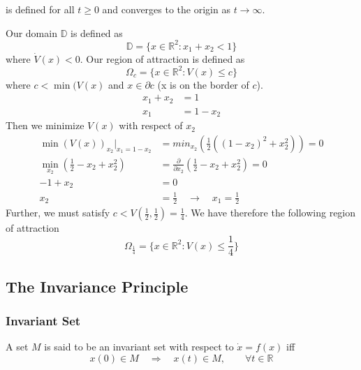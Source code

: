 \documentclass{article}
\newcommand{\mathbbD}{\mathbb{D}}
\newcommand{\mathbbR}{\mathbb{R}}
\begin{document}
is defined for all $t \geq 0$ and converges to the origin as $t \to \infty$.
\begin{frm-ex}
\item
Our domain $\mathbbD$ is defined as
\begin{equation*}
	\mathbbD = \{ x \in \mathbbR^2 : x_1 + x_2 < 1\}
\end{equation*}
where $\dot V(x) < 0$. Our region of attraction is defined as
\begin{equation*}
	\Omega_c = \{ x \in \mathbbR^2 : V(x) \leq c \}
\end{equation*}
where $c < \min(V(x)$ and $x \in \partial c$ (x is on the border of $c$).
\begin{equation*}
	\begin{split}
		x_1 + x_2 & = 1       \\
		x_1       & = 1 - x_2
	\end{split}
\end{equation*}
Then we minimize $V(x)$ with respect of $x_2$
\begin{equation*}
	\begin{split}
		\min(V(x))_{x_2}\bigg|_{x_1=1-x_2} & = min_{x_2}(\frac{1}{2}((1-x_2)^2+x_2^2)) = 0               \\
		\min_{x_2}(\frac{1}{2}-x_2+x_2^2)  & = \frac{\partial}{\partial x_2} (\frac{1}{2}-x_2+x_2^2) = 0 \\
		-1 + x_2                           & = 0                                                         \\
		x_2                                & = \frac{1}{2} \quad \to \quad x_1 = \frac{1}{2}
	\end{split}
\end{equation*}
Further, we must satisfy $c < V(\frac{1}{2}, \frac{1}{2}) = \frac{1}{4}$. We have therefore the following region of attraction
\begin{equation*}
	\Omega_{\frac{1}{4}} = \{x \in \mathbbR^2 : V(x) \leq \frac{1}{4}\}
\end{equation*}
\end{frm-ex}
\subsection{The Invariance Principle}
\subsubsection{Invariant Set}
A set $M$ is said to be an invariant set with respect to $\dot x = f(x)$ iff
\begin{equation*}
	x(0) \in M \quad \Rightarrow \quad x(t) \in M, \qquad \forall t \in \mathbb{R}
\end{equation*}
\end{document}
